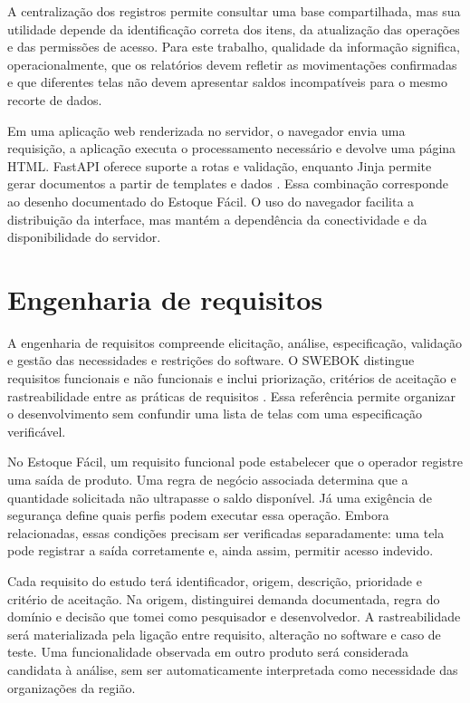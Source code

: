 A centralização dos registros permite consultar uma base compartilhada, mas sua utilidade depende da identificação correta dos itens, da atualização das operações e das permissões de acesso. Para este trabalho, qualidade da informação significa, operacionalmente, que os relatórios devem refletir as movimentações confirmadas e que diferentes telas não devem apresentar saldos incompatíveis para o mesmo recorte de dados.

Em uma aplicação web renderizada no servidor, o navegador envia uma requisição, a aplicação executa o processamento necessário e devolve uma página HTML. FastAPI oferece suporte a rotas e validação, enquanto Jinja permite gerar documentos a partir de templates e dados \cite{FastAPIDocs,JinjaDocs}. Essa combinação corresponde ao desenho documentado do Estoque Fácil. O uso do navegador facilita a distribuição da interface, mas mantém a dependência da conectividade e da disponibilidade do servidor.

\section{Engenharia de requisitos}

A engenharia de requisitos compreende elicitação, análise, especificação, validação e gestão das necessidades e restrições do software. O SWEBOK distingue requisitos funcionais e não funcionais e inclui priorização, critérios de aceitação e rastreabilidade entre as práticas de requisitos \cite{SWEBOK2026}. Essa referência permite organizar o desenvolvimento sem confundir uma lista de telas com uma especificação verificável.

No Estoque Fácil, um requisito funcional pode estabelecer que o operador registre uma saída de produto. Uma regra de negócio associada determina que a quantidade solicitada não ultrapasse o saldo disponível. Já uma exigência de segurança define quais perfis podem executar essa operação. Embora relacionadas, essas condições precisam ser verificadas separadamente: uma tela pode registrar a saída corretamente e, ainda assim, permitir acesso indevido.

Cada requisito do estudo terá identificador, origem, descrição, prioridade e critério de aceitação. Na origem, distinguirei demanda documentada, regra do domínio e decisão que tomei como pesquisador e desenvolvedor. A rastreabilidade será materializada pela ligação entre requisito, alteração no software e caso de teste. Uma funcionalidade observada em outro produto será considerada candidata à análise, sem ser automaticamente interpretada como necessidade das organizações da região.

